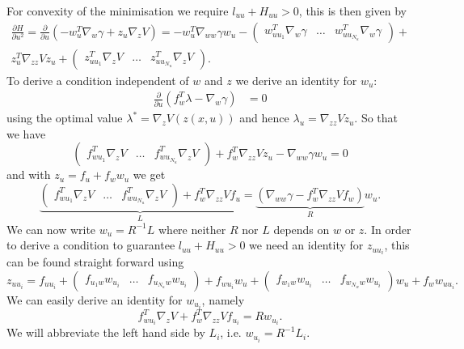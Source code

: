 %
For convexity of the minimisation we require $l_{uu}+H_{uu}>0$, this is then given by
%
\begin{equation}\begin{split}
	\frac{\partial H}{\partial u^2} = \frac{\partial}{\partial u} \left(- w_u^T\nabla_w\gamma + z_u \nabla_z V\right)
	= -w_u^T \nabla_{ww}\gamma w_u - \left(\begin{array}{ccc}
	w_{u{u_1}}^T\nabla_w\gamma & \dots & w_{u{u_{N_u}}}^T\nabla_w\gamma
	\end{array}\right)+\\ z_u^T\nabla_{zz} V z_u + \left(\begin{array}{ccc}
	z_{uu_1}^T\nabla_z V & \dots & z_{uu_{N_u}}^T\nabla_z V
	\end{array}\right).
\end{split}\end{equation}
%
To derive a condition independent of $w$ and $z$ we derive an identity for $w_u$:
%
\begin{equation}\begin{split}
	\frac{\partial}{\partial u} (f_w^T\lambda-\nabla_w\gamma) &= 0
\end{split}\end{equation}
%
using the optimal value $\lambda^\ast=\nabla_z V(z(x,u))$ and hence $\lambda_u = \nabla_{zz}V z_u$.
%
So that we have
%
\begin{equation}
	\left(\begin{array}{ccc} f_{wu_1}^T \nabla_z V & \dots & f_{wu_{N_u}}^T\nabla_z V \end{array}\right) + f_w^T\nabla_{zz}V z_u
	-\nabla_{ww}\gamma w_u=0
\end{equation}
%
and with $z_u = f_u + f_w w_u$ we get
%
\begin{equation}
	\underbrace{\left(\begin{array}{ccc} f_{wu_1}^T \nabla_z V & \dots & f_{wu_{N_u}}^T\nabla_z V \end{array}\right) + f_w^T\nabla_{zz}V f_u}_L =
	\underbrace{(\nabla_{ww}\gamma-f_w^T\nabla_{zz}V f_w)}_R w_u.
\end{equation}
%
We can now write $w_u = R^{-1}L$ where neither $R$ nor $L$ depends on $w$ or $z$.
%
In order to derive a condition to guarantee $l_{uu}+H_{uu}>0$ we need an identity for $z_{uu_i}$, this
can be found straight forward using
%
\begin{equation}
	z_{uu_i} = f_{uu_i} + \left(\begin{array}{ccc}
	f_{u_1w}w_{u_i} & \dots & f_{u_{N_u}w} w_{u_i}
	\end{array}\right) + f_{wu_i}w_u + \left(\begin{array}{ccc}
	f_{w_1w} w_{u_i} & \dots & f_{w_{N_w}w}w_{u_i}
	\end{array}\right)w_u + f_w w_{uu_i}.
\end{equation}
%
We can easily derive an identity for $w_{u_i}$, namely
%
\begin{equation}
	f_{wu_i}^T\nabla_z V + f_w^T \nabla_{zz}V f_{u_i} = R w_{u_i}.
\end{equation}
%
We will abbreviate the left hand side by $L_i$, i.e. $w_{u_i} = R^{-1}L_i$.


